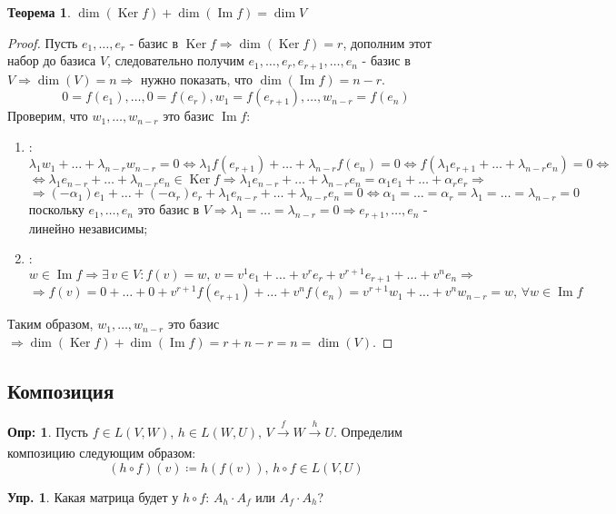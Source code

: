 \documentclass[12pt]{article}
\theoremstyle{definition}
\newtheorem{defn}{Опр:}
\newtheorem{exrc}{Упр.}
\newtheorem{theorem}{Теорема}
\DeclareMathOperator{\Ker}{Ker}
\DeclareMathOperator{\Ima}{Im}
\begin{document}
\begin{theorem}
	$\dim{(\Ker{f})} + \dim{(\Ima{f})} = \dim{V}$
\end{theorem}
\begin{proof}
	Пусть $e_1, \dotsc, e_r$ - базис в $\Ker{f} \Rightarrow \dim{(\Ker{f})} = r$, дополним этот набор до базиса $V$, следовательно получим $e_1, \dotsc, e_r, e_{r+1}, \dotsc, e_n$ - базис в $V \Rightarrow \dim{(V)} = n \Rightarrow$ нужно показать, что $\dim{(\Ima{f})} = n - r$.
	$$
		0 = f(e_1), \dotsc, 0 = f(e_r), w_1 = f(e_{r+1}), \dotsc, w_{n-r} = f(e_n)
	$$
	Проверим, что $w_1, \dotsc, w_{n-r}$ это базис $\Ima{f}$:
	\begin{enumerate}[label ={(\arabic*)}]
		\item {}: 
		$$
			\lambda_1 w_1 + \dotsc + \lambda_{n-r} w_{n-r} = 0 \Leftrightarrow \lambda_1 f(e_{r+1}) + \dotsc + \lambda_{n-r}f(e_n) = 0 \Leftrightarrow f(\lambda_1 e_{r+1} + \dotsc + \lambda_{n-r} e_n) = 0 \Leftrightarrow
		$$
		$$
			\Leftrightarrow \lambda_1 e_{n-r} + \dotsc + \lambda_{n-r} e_n \in \Ker{f} \Rightarrow \lambda_1 e_{n-r} + \dotsc + \lambda_{n-r} e_n = \alpha_1 e_1 + \dotsc + \alpha_r e_r \Rightarrow
		$$
		$$
			\Rightarrow (-\alpha_1)e_1 + \dotsc + (-\alpha_r) e_r + \lambda_1 e_{n-r} + \dotsc + \lambda_{n-r}e_n = 0 \Leftrightarrow \alpha_1 = \dotsc = \alpha_r = \lambda_1 = \dotsc = \lambda_{n-r} = 0
		$$
		поскольку $e_1, \dotsc, e_n$ это базис в $V \Rightarrow \lambda_1 = \dotsc = \lambda_{n-r} = 0 \Rightarrow e_{r+1}, \dotsc, e_n$ - линейно независимы;
		\item {}: 
		$$
			w \in \Ima{f} \Rightarrow \exists \, v \in V \colon f(v) = w, \, v = v^1e_1 + \dotsc + v^r e_r + v^{r+1}e_{r+1} + \dotsc + v^n e_n \Rightarrow
		$$
		$$
			\Rightarrow f(v) = 0 + \dotsc + 0 + v^{r+1} f(e_{r+1}) + \dotsc + v^n f(e_n) = v^{r+1} w_1 + \dotsc + v^n w_{n-r} = w, \, \forall w \in \Ima{f}
		$$
	\end{enumerate}
	Таким образом, $w_1, \dotsc, w_{n-r}$ это базис $\Rightarrow \dim{(\Ker{f})} + \dim{(\Ima f)} = r + n -r = n = \dim{(V)}$.
\end{proof}
\subsection*{Композиция}

\begin{defn}
	Пусть $f \in L(V,W), \, h \in L(W,U), \, V \xrightarrow[]{f}W \xrightarrow[]{h}U$. Определим композицию следующим образом: 
	$$
		(h \circ f)(v)\coloneqq h\left(f(v)\right), \, h \circ f \in L(V,U)
	$$	
\end{defn}
\begin{exrc}
	Какая матрица будет у $h \circ f$: $A_h {\cdot} A_f$ или $A_f {\cdot} A_h$?
\end{exrc}
\newpage
\end{document}
